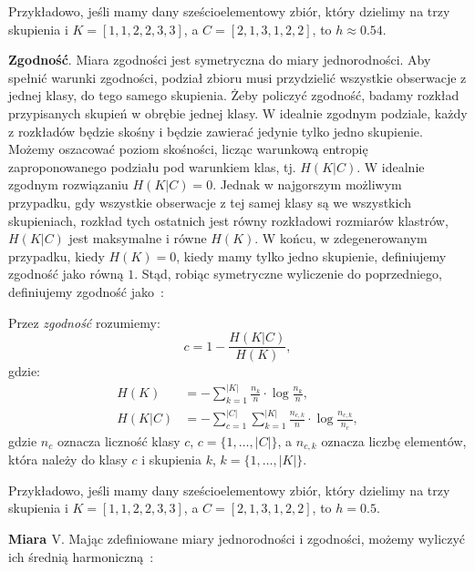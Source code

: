 \documentclass{praca1}
\begin{document}
Przykładowo, jeśli mamy dany sześcioelementowy zbiór, który dzielimy na trzy skupienia i $K = [1, 1, 2, 2, 3, 3]$, a $C = [2, 1, 3, 1, 2, 2]$, to $h \approx 0.54$.

\textbf{Zgodność}. Miara zgodności jest symetryczna do miary jednorodności. Aby spełnić warunki zgodności, podział zbioru musi przydzielić wszystkie obserwacje z jednej klasy, do tego samego skupienia. Żeby policzyć zgodność, badamy rozkład przypisanych skupień w obrębie jednej klasy. W idealnie zgodnym podziale, każdy z rozkładów będzie skośny i będzie zawierać jedynie tylko jedno skupienie. Możemy oszacować poziom skośności, licząc warunkową entropię zaproponowanego podziału pod warunkiem klas, tj. $H(K|C)$. W idealnie zgodnym rozwiązaniu $H(K|C) = 0$. Jednak w najgorszym możliwym przypadku, gdy wszystkie obserwacje z tej samej klasy są we wszystkich skupieniach, rozkład tych ostatnich jest równy rozkładowi rozmiarów klastrów, $H(K|C)$ jest maksymalne i równe $H(K)$. W końcu, w zdegenerowanym przypadku, kiedy $H(K) = 0$, kiedy mamy tylko jedno skupienie, definiujemy zgodność jako równą $1$. Stąd, robiąc symetryczne wyliczenie do poprzedniego, definiujemy zgodność jako~\cite{Rosenberg2007:vmeasure}:

\begin{definition}
Przez \emph{zgodność} rozumiemy:
\begin{equation}
c = %
1 - \frac{H(K|C)}{H(K)}, %
\end{equation}
gdzie:
\begin{align*}
H(K) & = - \sum\limits_{k = 1}^{|K|}\frac{n_k}{n}\cdot \log{\frac{n_k}{n}},  \\
H(K|C) & = - \sum\limits_{c = 1}^{|C|}\sum\limits_{k = 1}^{|K|}\frac{n_{c,k}}{n}\cdot \log{\frac{n_{c,k}}{n_c}},
\end{align*}
gdzie $n_c$ oznacza liczność klasy $c$, $c = \{1,\ldots, |C|\}$, a $n_{c,k}$ oznacza liczbę elementów, która należy do klasy $c$ i skupienia $k$, $k = \{1,\ldots, |K|\}$.
\end{definition}

Przykładowo, jeśli mamy dany sześcioelementowy zbiór, który dzielimy na trzy skupienia i $K = [1, 1, 2, 2, 3, 3]$, a $C = [2, 1, 3, 1, 2, 2]$, to $h = 0.5$.

\textbf{Miara $\textrm{V}$}. Mając zdefiniowane miary jednorodności i zgodności, możemy wyliczyć ich średnią harmoniczną~\cite{Rosenberg2007:vmeasure}:
\end{document}
